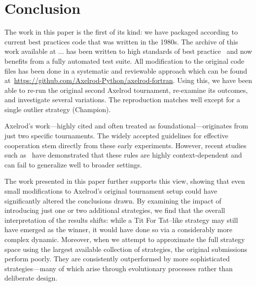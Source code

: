 \documentclass{article}
\begin{document}
\section{Conclusion}\label{sec:conclusion}

The work in this paper is the first of its kind: we have packaged according to
current best practices code that was written in the 1980s. The archive of this work
available at ...%
has been written to high standards of best practice~\cite{wilson2014} and now benefits
from a fully automated test suite. All modification to the original code files
has been done in a systematic and reviewable approach which can be found
at~\url{https://github.com/Axelrod-Python/axelrod-fortran}. Using this, we have been
able to re-run the original second Axelrod tournament,
re-examine its outcomes, and investigate several variations. The reproduction matches well
except for a single outlier strategy (Champion).

Axelrod’s work—highly cited and often treated as foundational—originates from
just two specific tournaments. The widely accepted guidelines for effective
cooperation stem directly from these early experiments. However, recent studies
such as~\cite{glynatsi2024properties} have demonstrated that these rules are
highly context-dependent and can fail to generalize well to broader settings.

The work presented in this paper further supports this view, showing that even
small modifications to Axelrod’s original tournament setup could have
significantly altered the conclusions drawn. By examining the impact of
introducing just one or two additional strategies, we find that the overall
interpretation of the results shifts: while a Tit For Tat–like strategy may
still have emerged as the winner, it would have done so via a considerably more
complex dynamic. Moreover, when we attempt to approximate the full strategy space using the
largest available collection of strategies, the original submissions perform
poorly. They are consistently outperformed by more sophisticated strategies—many
of which arise through evolutionary processes rather than deliberate design.

\end{document}
